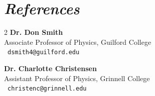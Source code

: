 \documentclass[11pt,letterpaper,sans]{moderncv}
\begin{document}
\section{\textit{References}}

\begin{multicols}{2}
\textbf{Dr. Don Smith}\\
Associate Professor of Physics, Guilford College \\
\emailsymbol~\texttt{dsmith4@guilford.edu}

\vfill\null
\columnbreak

\textbf{Dr. Charlotte Christensen}\\
Assistant Professor of Physics, Grinnell College\\
\emailsymbol~\texttt{christenc@grinnell.edu}

\end{multicols}

\vfill


\end{document}
